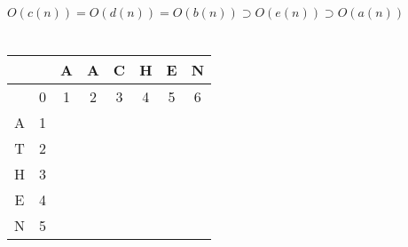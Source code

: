 \documentclass[12pt, a4paper]{article}
\begin{document}
\section{} %

$O(c(n)) = O(d(n)) = O(b(n)) \supset O(e(n)) \supset O(a(n))$

\section{} %

\begin{tabular}{|c|c|c|c|c|c|c|c|}
	\hline
	&& A & A & C & H & E & N\\\hline
	& 0 & 1 & 2 & 3 & 4 & 5 & 6\\\hline
	A & 1 &&&&&&\\\hline
	T & 2 &&&&&&\\\hline
	H & 3 &&&&&&\\\hline
	E & 4 &&&&&&\\\hline
	N & 5 &&&&&&\\\hline
\end{tabular}
\end{document}
